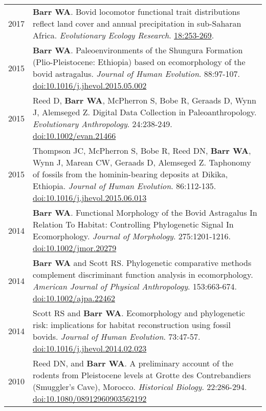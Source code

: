 \documentclass{article}
\begin{document}
\begin{longtable}{p{}p{}}
2017 & {\bfseries Barr WA}. Bovid locomotor functional trait distributions reflect land cover and annual precipitation in sub-Saharan Africa. \emph{Evolutionary Ecology Research}.  \href{http://www.evolutionary-ecology.com/issues/v18/n03/ddar3051.pdf}{18:253-269}.\\[4pt]

2015 & {\bfseries Barr WA}. Paleoenvironments of the Shungura Formation (Plio-Pleistocene: Ethiopia) based on ecomorphology of the bovid astragalus. \emph{Journal of Human Evolution}. 88:97-107. \href{http://dx.doi.org/10.1016/j.jhevol.2015.05.002}{doi:10.1016/j.jhevol.2015.05.002}\\[4pt]

2015 & Reed D, {\bfseries Barr WA}, McPherron S, Bobe R, Geraads D, Wynn J, Alemseged Z. Digital Data Collection in Paleoanthropology. \emph{Evolutionary Anthropology}. 24:238-249. \href{http://dx.doi.org/10.1002/evan.21466}{doi:10.1002/evan.21466}\\[4pt]

2015 & Thompson JC, McPherron S, Bobe R, Reed DN, {\bfseries Barr WA}, Wynn J, Marean CW, Geraads D, Alemseged Z. Taphonomy of fossils from the hominin-bearing deposits at Dikika, Ethiopia. \emph{Journal of Human Evolution}. 86:112-135. \href{http://dx.doi.org/10.1016/j.jhevol.2015.06.013}{doi:10.1016/j.jhevol.2015.06.013}\\[4pt]

2014 & {\bfseries Barr WA}. Functional Morphology of the Bovid Astragalus In Relation To Habitat: Controlling Phylogenetic Signal In Ecomorphology. \emph{Journal
of Morphology}. 275:1201-1216. \href{http://dx.doi.org/10.1002/jmor.20279}{doi:10.1002/jmor.20279}\\[4pt]

2014 & {\bfseries Barr WA} and Scott RS. Phylogenetic comparative methods complement discriminant function analysis in ecomorphology. \emph{American Journal
of Physical Anthropology}. 153:663-674. \href{http://dx.doi.org/10.1002/ajpa.22462}{doi:10.1002/ajpa.22462}\\[4pt]

2014 & Scott RS and {\bfseries Barr WA}. Ecomorphology and phylogenetic risk: implications for habitat reconstruction using fossil bovids.
\emph{Journal of Human Evolution}. 73:47-57. \href{http://dx.doi.org/10.1016/j.jhevol.2014.02.023}{doi:10.1016/j.jhevol.2014.02.023}\\[4pt]

2010 & Reed DN, and {\bfseries Barr WA}. A preliminary account of the rodents from Pleistocene levels at Grotte des Contrebandiers (Smuggler's Cave),
Morocco. \emph{Historical Biology}. 22:286-294. \href{http://dx.doi.org/10.1080/08912960903562192}{doi:10.1080/08912960903562192}\\
\end{longtable}
\end{document}
